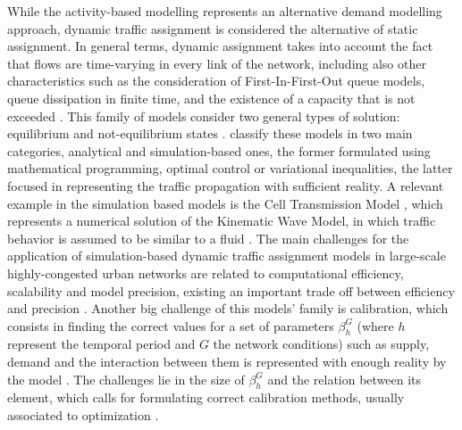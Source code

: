 \documentclass[Journal,letterpaper]{ascelike-new}
\begin{document}
While the activity-based modelling represents an alternative demand modelling approach, dynamic traffic assignment is considered the alternative of static assignment. In general terms, dynamic assignment takes into account the fact that flows are time-varying in every link of the network, including also other characteristics such as the consideration of First-In-First-Out queue models, queue dissipation in finite time, and the existence of a capacity that is not exceeded \citep{OrtuzarWillumsen2011}. This family of models consider two general types of solution: equilibrium and not-equilibrium states \citep{friesz2007analytical}. \cite{peeta2001foundations} classify these models in two main categories, analytical and simulation-based ones, the former formulated using mathematical programming, optimal control or variational inequalities, the latter focused in representing the traffic propagation with sufficient reality. A relevant example in the simulation based models is the Cell Transmission Model \citep{daganzo1994cell}, which represents a numerical solution of the Kinematic Wave Model, in which traffic behavior is assumed to be similar to a fluid \citep{flugel2014evaluation}. The main challenges for the application of simulation-based dynamic traffic assignment models in large-scale highly-congested urban networks are related to computational efficiency, scalability and model precision, existing an important trade off between efficiency and precision \citep{wei2010critical}. Another big challenge of this models' family is calibration, which consists in finding the correct values for a set of parameters $\beta_{h}^{G}$ (where $h$ represent the temporal period and $G$ the network conditions) such as supply, demand and the interaction between them is represented with enough reality by the model \citep{balakrishna2006off}. The challenges lie in the size of $\beta_{h}^{G}$ and the relation between its element, which calls for formulating correct calibration methods, usually associated to optimization \citep{balakrishna2006off}. 
\end{document}
